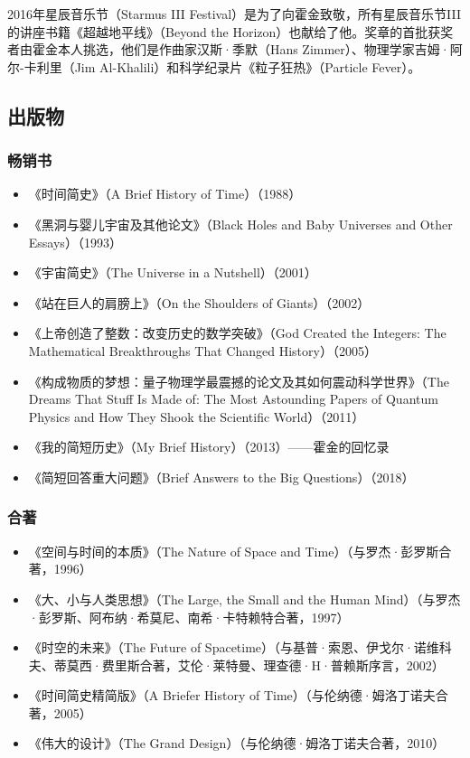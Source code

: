 2016年星辰音乐节（Starmus III Festival）是为了向霍金致敬，所有星辰音乐节III的讲座书籍《超越地平线》（Beyond the Horizon）也献给了他。奖章的首批获奖者由霍金本人挑选，他们是作曲家汉斯·季默（Hans Zimmer）、物理学家吉姆·阿尔-卡利里（Jim Al-Khalili）和科学纪录片《粒子狂热》（Particle Fever）。
\subsection{出版物}  
\subsubsection{畅销书}  
\begin{itemize}
\item 《时间简史》（A Brief History of Time）（1988）  
\item 《黑洞与婴儿宇宙及其他论文》（Black Holes and Baby Universes and Other Essays）（1993）  
\item 《宇宙简史》（The Universe in a Nutshell）（2001）  
\item 《站在巨人的肩膀上》（On the Shoulders of Giants）（2002）  
\item 《上帝创造了整数：改变历史的数学突破》（God Created the Integers: The Mathematical Breakthroughs That Changed History）（2005）  
\item 《构成物质的梦想：量子物理学最震撼的论文及其如何震动科学世界》（The Dreams That Stuff Is Made of: The Most Astounding Papers of Quantum Physics and How They Shook the Scientific World）（2011）  
\item 《我的简短历史》（My Brief History）（2013）——霍金的回忆录  
\item 《简短回答重大问题》（Brief Answers to the Big Questions）（2018） 
\end{itemize} 
\subsubsection{合著} 
\begin{itemize}
\item 《空间与时间的本质》（The Nature of Space and Time）（与罗杰·彭罗斯合著，1996）  
\item 《大、小与人类思想》（The Large, the Small and the Human Mind）（与罗杰·彭罗斯、阿布纳·希莫尼、南希·卡特赖特合著，1997）  
\item 《时空的未来》（The Future of Spacetime）（与基普·索恩、伊戈尔·诺维科夫、蒂莫西·费里斯合著，艾伦·莱特曼、理查德·H·普赖斯序言，2002）  
\item 《时间简史精简版》（A Briefer History of Time）（与伦纳德·姆洛丁诺夫合著，2005）  
\item 《伟大的设计》（The Grand Design）（与伦纳德·姆洛丁诺夫合著，2010）  
\end{itemize}
